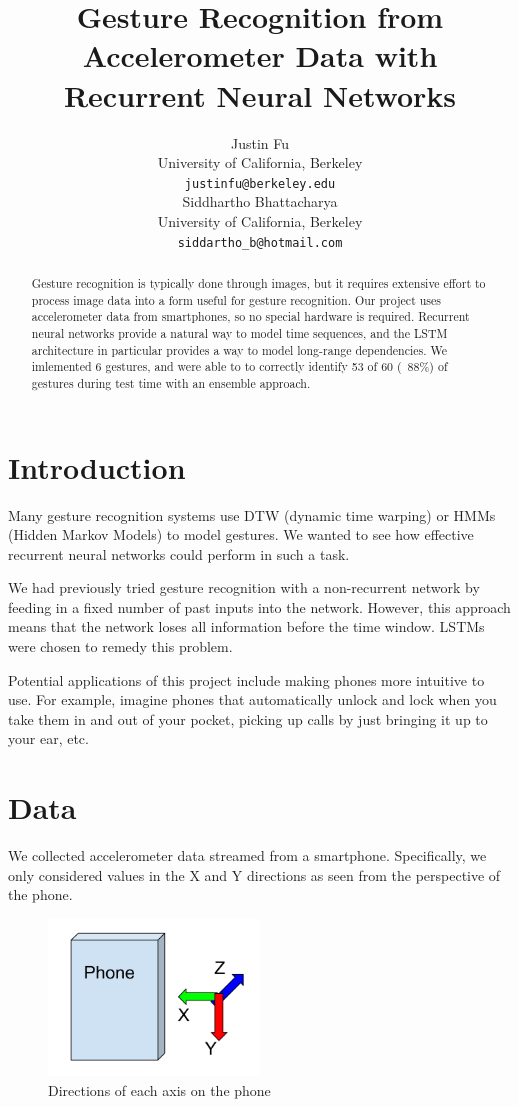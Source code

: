 \documentclass[11pt]{article}
\title{Gesture Recognition from Accelerometer Data with Recurrent Neural Networks}
\author{Justin Fu \\
  University of California, Berkeley\\
  {\tt justinfu@berkeley.edu} \\\And
  Siddhartho Bhattacharya \\
  University of California, Berkeley\\
  {\tt siddartho\_b@hotmail.com} \\}
\date{}
\begin{document}
\maketitle 
\begin{abstract}
  Gesture recognition is typically done through images, but it requires
  extensive effort to process image data into a form useful for gesture
  recognition. Our project uses accelerometer data from smartphones,
  so no special hardware is required.
  Recurrent neural networks provide a natural way to model time
  sequences, and the LSTM architecture in particular provides a way
  to model long-range dependencies. We imlemented 6 gestures, and were able to
  to correctly identify 53 of 60 (~88\%) of gestures during test time with
  an ensemble approach.
\end{abstract}

\section{Introduction}

Many gesture recognition systems use DTW (dynamic time
warping) or HMMs (Hidden Markov Models) to model gestures.
We wanted to see how effective recurrent neural networks
could perform in such a task.

We had previously tried gesture recognition with a
non-recurrent network by feeding in a fixed number of
past inputs into the network. However, this approach
means that the network loses all information before
the time window. LSTMs were chosen to remedy this problem.

Potential applications of this project include making
phones more intuitive to use. For example, imagine 
phones that automatically unlock and lock when you take 
them in and out of your pocket, picking up calls by just
bringing it up to your ear, etc.

\section{Data}

We collected accelerometer data streamed from a smartphone.
Specifically, we only considered values in the X and Y directions
as seen from the perspective of the phone. 

\begin{figure}[ht]
\caption{Directions of each axis on the phone}
  \centering
    \includegraphics[width=0.5\textwidth]{phone_axis}
\end{figure}
\end{document}
